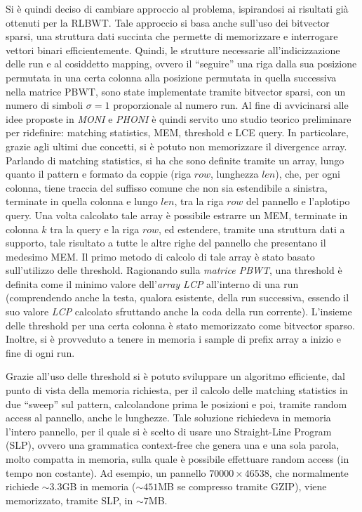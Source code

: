 \documentclass[a4paper,11pt, oneside,italian]{article}
\begin{document}
Si è quindi deciso di cambiare approccio al problema, ispirandosi ai risultati
già ottenuti per la RLBWT. Tale approccio si basa anche sull'uso dei bitvector
sparsi, una struttura dati succinta che permette di memorizzare e interrogare
vettori binari efficientemente.
Quindi, le strutture necessarie all'indicizzazione delle run e al cosiddetto
mapping, ovvero il ``seguire'' una riga dalla sua posizione permutata in una
certa colonna alla posizione permutata in quella successiva nella matrice PBWT,
sono state implementate tramite bitvector sparsi, con un numero di simboli
$\sigma=1$ proporzionale al numero run.
Al fine di avvicinarsi alle idee proposte in \textit{MONI} e \textit{PHONI} è
quindi servito uno studio teorico preliminare per ridefinire: matching
statistics, MEM, threshold e LCE query. In particolare, grazie agli 
ultimi due concetti, si è potuto non memorizzare il divergence array.
Parlando di matching statistics, si ha che sono definite tramite un array, lungo
quanto il pattern e formato da coppie (riga $row$, lunghezza $len$), che, per
ogni colonna, tiene traccia del suffisso comune che non sia estendibile a
sinistra, terminate in quella colonna e lungo $len$, tra la riga $row$ del
pannello e l'aplotipo query. Una volta calcolato tale
array è possibile estrarre un MEM, terminate in colonna $k$ tra la query e la
riga $row$, ed estendere, tramite una struttura dati a supporto, tale risultato
a tutte le altre righe del pannello che presentano il medesimo MEM.
Il primo metodo di calcolo di tale array è stato basato sull'utilizzo delle
threshold. Ragionando sulla \textit{matrice PBWT}, una threshold è definita
come il minimo valore dell'\textit{array LCP} all'interno di una run
(comprendendo anche la testa, qualora esistente, della run successiva, essendo
il suo valore \textit{LCP} calcolato sfruttando anche la coda della run
corrente). L'insieme delle threshold per una certa colonna è stato memorizzato
come bitvector sparso. Inoltre, si è provveduto a tenere in memoria i
sample di prefix array a inizio e fine di ogni run.

Grazie all'uso delle threshold si è potuto sviluppare un algoritmo
efficiente, dal punto di vista della memoria richiesta, per il calcolo delle
matching statistics in due ``sweep'' sul pattern, calcolandone prima le
posizioni e poi, tramite random access al pannello, anche le
lunghezze. Tale soluzione richiedeva in memoria l'intero pannello, per il quale
si è scelto di usare uno Straight-Line Program (SLP), ovvero una grammatica
context-free che genera una e una sola parola, molto compatta in memoria, sulla
quale è possibile effettuare random access (in tempo non costante). Ad esempio,
un pannello $70000 \times 46538$, che normalmente richiede $\sim 3.3$GB in
memoria ($\sim 451$MB se compresso tramite GZIP), viene memorizzato, tramite
SLP, in $\sim 7$MB.
\end{document}
